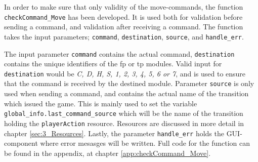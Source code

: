 \documentclass[runningheads,a4paper]{llncs}
\begin{document}
In order to make sure that only validity of the move-commands, the function \verb!checkCommand_Move! has been developed. It is used both for validation before sending a command, and validation after receiving a command. The function takes the input parameters; \verb!command!, \verb!destination!, \verb!source!, and \verb!handle_err!. 
\newline

The input parameter \verb!command! contains the actual command, \verb!destination! contains the unique identifiers of the \ac{fp} or \ac{tp} modules. Valid input for \verb!destination! would be \textit{C, D, H, S, 1, 2, 3, 4, 5, 6 or 7}, and is used to ensure that the command is received by the destined module. Parameter \verb!source! is only used when sending a command, and contains the actual name of the transition which issued the game. This is mainly used to set the variable \verb!global_info.last_command_source! which will be the name of the transition holding the \verb!playerAction! resource. Resources are discussed in more detail in chapter \ref{sec:3_Resources}. Lastly, the parameter \verb!handle_err! holds the GUI-component where error mesasges will be written. Full code for the function can be found in the appendix, at chapter \ref{app:checkCommand_Move}.
\\
\end{document}
